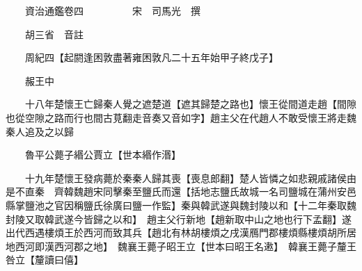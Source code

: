 










 


 
 


 

  
  
  
  
  





  
  
  
  
  
 
  

  

  
  
  



  

 
 

  
   




  

  
  


  　　資治通鑑卷四　　　　　宋　司馬光　撰

　　胡三省　音註

　　周紀四【起閼逢困敦盡著雍困敦凡二十五年始甲子終戊子】

　　赧王中

　　十八年楚懷王亡歸秦人覺之遮楚道【遮其歸楚之路也】懷王從間道走趙【間隙也從空隙之路而行也間古莧翻走音奏又音如字】趙主父在代趙人不敢受懷王將走魏秦人追及之以歸

　　魯平公薨子緡公賈立【世本緡作湣】

　　十九年楚懷王發病薨於秦秦人歸其喪【喪息郎翻】楚人皆憐之如悲親戚諸侯由是不直秦　齊韓魏趙宋同擊秦至鹽氏而還【括地志鹽氏故城一名司鹽城在蒲州安邑縣掌鹽池之官因稱鹽氏徐廣曰鹽一作監】秦與韓武遂與魏封陵以和【十二年秦取魏封陵又取韓武遂今皆歸之以和】　趙主父行新地【趙新取中山之地也行下孟翻】遂出代西遇樓煩王於西河而致其兵【趙北有林胡樓煩之戌漢鴈門郡樓煩縣樓煩胡所居地西河即漢西河郡之地】　魏襄王薨子昭王立【世本曰昭王名遫】　韓襄王薨子釐王咎立【釐讀曰僖】

